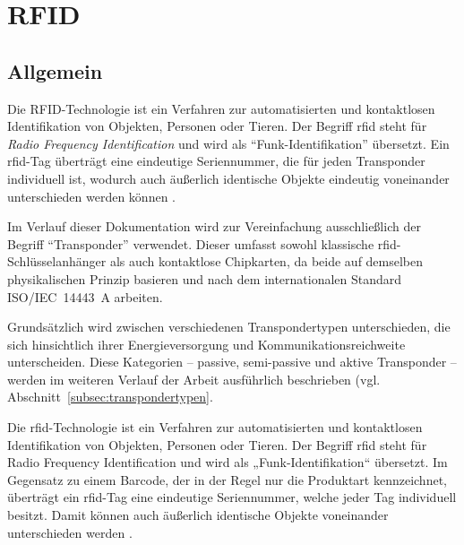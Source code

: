 
\chapter{RFID}



\section{Allgemein}

Die RFID-Technologie ist ein Verfahren zur automatisierten und kontaktlosen Identifikation von Objekten, Personen oder Tieren. 
Der Begriff \ac{rfid} steht für \textit{Radio Frequency Identification} und wird als \enquote{Funk-Identifikation} übersetzt. 
Ein \ac{rfid}-Tag überträgt eine eindeutige Seriennummer, die für jeden Transponder individuell ist, 
wodurch auch äußerlich identische Objekte eindeutig voneinander unterschieden werden können \cite{Heuermann:2023}.

Im Verlauf dieser Dokumentation wird zur Vereinfachung ausschließlich der Begriff \enquote{Transponder} verwendet. 
Dieser umfasst sowohl klassische \ac{rfid}-Schlüsselanhänger als auch kontaktlose Chipkarten, 
da beide auf demselben physikalischen Prinzip basieren und nach dem internationalen Standard ISO/IEC~14443~A arbeiten.

Grundsätzlich wird zwischen verschiedenen Transpondertypen unterschieden, 
die sich hinsichtlich ihrer Energieversorgung und Kommunikationsreichweite unterscheiden. 
Diese Kategorien – passive, semi-passive und aktive Transponder – werden im weiteren Verlauf der Arbeit ausführlich beschrieben (vgl. Abschnitt~\ref{subsec:transpondertypen}.



Die \ac{rfid}-Technologie ist ein Verfahren zur automatisierten und kontaktlosen Identifikation von Objekten, Personen oder Tieren. 
Der Begriff \ac{rfid} steht für Radio Frequency Identification und wird als „Funk-Identifikation“ übersetzt. 
Im Gegensatz zu einem Barcode, der in der Regel nur die Produktart kennzeichnet, überträgt ein \ac{rfid}-Tag eine eindeutige Seriennummer, welche jeder Tag individuell besitzt.
Damit können auch äußerlich identische Objekte voneinander unterschieden werden \cite{Heuermann:2023}. 


